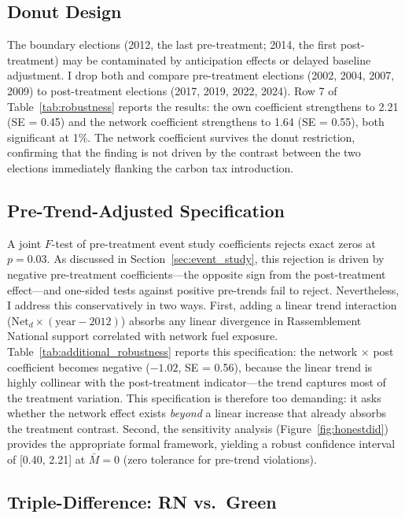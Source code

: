 \documentclass[12pt]{article}
\newcommand{\rn}{Rassemblement National}
\begin{document}


\subsection{Donut Design}

The boundary elections (2012, the last pre-treatment; 2014, the first post-treatment) may be contaminated by anticipation effects or delayed baseline adjustment. I drop both and compare pre-treatment elections (2002, 2004, 2007, 2009) to post-treatment elections (2017, 2019, 2022, 2024). Row 7 of Table~\ref{tab:robustness} reports the results: the own coefficient strengthens to 2.21 (SE = 0.45) and the network coefficient strengthens to 1.64 (SE = 0.55), both significant at 1\%. The network coefficient survives the donut restriction, confirming that the finding is not driven by the contrast between the two elections immediately flanking the carbon tax introduction.

\subsection{Pre-Trend-Adjusted Specification}

A joint $F$-test of pre-treatment event study coefficients rejects exact zeros at $p = 0.03$. As discussed in Section~\ref{sec:event_study}, this rejection is driven by negative pre-treatment coefficients---the opposite sign from the post-treatment effect---and one-sided tests against positive pre-trends fail to reject. Nevertheless, I address this conservatively in two ways. First, adding a linear trend interaction ($\text{Net}_d \times (\text{year} - 2012)$) absorbs any linear divergence in \rn{} support correlated with network fuel exposure. Table~\ref{tab:additional_robustness} reports this specification: the network $\times$ post coefficient becomes negative ($-1.02$, SE = 0.56), because the linear trend is highly collinear with the post-treatment indicator---the trend captures most of the treatment variation. This specification is therefore too demanding: it asks whether the network effect exists \emph{beyond} a linear increase that already absorbs the treatment contrast. Second, the \citet{rambachan2023more} sensitivity analysis (Figure~\ref{fig:honestdid}) provides the appropriate formal framework, yielding a robust confidence interval of [0.40, 2.21] at $\bar{M} = 0$ (zero tolerance for pre-trend violations).

\subsection{Triple-Difference: RN vs.\ Green}
\end{document}
